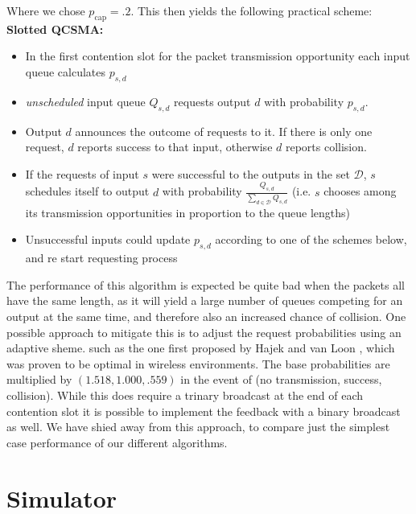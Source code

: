 \documentclass[11pt]{article}%
\begin{document}
Where we chose $p_{\text{cap}}=.2$.  This then yields the following practical scheme:\\

{\bf Slotted QCSMA:}
\begin{itemize}
\item In the first contention slot for the packet transmission opportunity each input queue calculates $p_{s,d}$
\item {\it unscheduled} input queue $Q_{s,d}$ requests output $d$ with probability $p_{s,d}$.
\item Output $d$ announces the outcome of requests to it.  If there is only one request, $d$ reports success to that input, otherwise $d$ reports collision.%
\item If the requests of input $s$ were successful to the outputs in the set $\mathcal{D}$, $s$ schedules itself to output $d$ with probability $\frac{Q_{s,d}}{\sum_{d\in \mathcal{D}}Q_{s,d}}$ (i.e. $s$ chooses among its transmission opportunities in proportion to the queue lengths)
\item Unsuccessful inputs could update $p_{s,d}$ according to one of the schemes below, and re start requesting process\\
\end{itemize}

The performance of this algorithm is expected be quite bad when the packets all have the same length, as it will yield a large number of queues competing for an output at the same time, and therefore also an increased chance of collision.  One possible approach to mitigate this is to adjust the request probabilities using an adaptive sheme. such as the one first proposed by Hajek and van Loon \cite{Hajek_van_Loon}, which was proven to be optimal in wireless environments.  The base probabilities are multiplied by $(1.518,1.000,.559)$  in the event of (no transmission, success, collision).  While this does require a trinary broadcast at the end of each contention slot it is possible to implement the feedback with a binary broadcast as well.  We have shied away from this approach, to compare just the simplest case performance of our different algorithms.



\section{Simulator}
\end{document}
